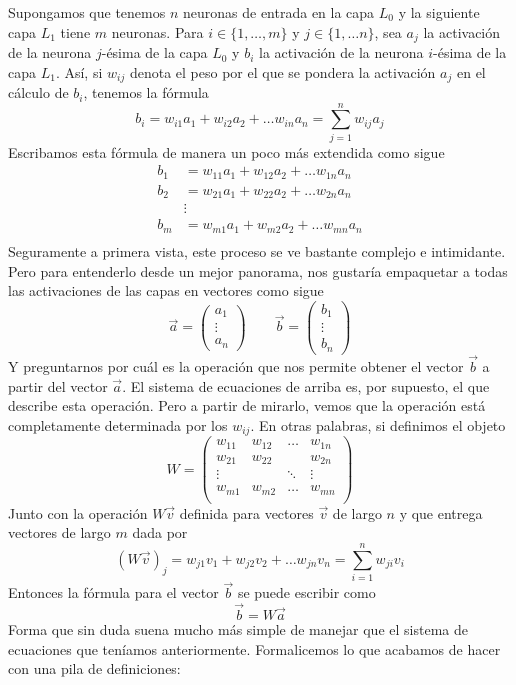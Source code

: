 Supongamos que tenemos $n$ neuronas de entrada en la capa $L_0$ y la siguiente capa $L_1$ tiene $m$ neuronas. Para $i \in \{1, \dots, m\}$ y $j \in \{1, \dots n\}$, sea $a_j$ la activación de la neurona $j$-ésima de la capa $L_0$ y $b_i$ la activación de la neurona $i$-ésima de la capa $L_1$. Así, si $w_{ij}$ denota el peso por el que se pondera la activación $a_j$ en el cálculo de $b_i$, tenemos la fórmula
\[b_i = w_{i1} a_1 + w_{i2} a_2 + \dots w_{in} a_n = \sum_{j=1}^n w_{ij} a_j\]
Escribamos esta fórmula de manera un poco más extendida como sigue
\begin{align*}
    b_1 &= w_{11} a_1 + w_{12} a_2 + \dots w_{1n} a_n \\
    b_2 &= w_{21} a_1 + w_{22} a_2 + \dots w_{2n} a_n \\
    &\vdots \\
    b_m &= w_{m1} a_1 + w_{m2} a_2 + \dots w_{mn} a_n \\
\end{align*}
Seguramente a primera vista, este proceso se ve bastante complejo e intimidante. Pero para entenderlo desde un mejor panorama, nos gustaría empaquetar a todas las activaciones de las capas en vectores como sigue
\[\vec{a} = \begin{pmatrix}
    a_1\\ \vdots \\ a_n
\end{pmatrix} \qquad \vec{b} = \begin{pmatrix}
    b_1\\ \vdots \\ b_n
\end{pmatrix}\]
Y preguntarnos por cuál es la operación que nos permite obtener el vector $\vec{b}$ a partir del vector $\vec{a}$. El sistema de ecuaciones de arriba es, por supuesto, el que describe esta operación. Pero a partir de mirarlo, vemos que la operación está completamente determinada por los $w_{ij}$. En otras palabras, si definimos el objeto
\[W = \begin{pmatrix}
    w_{11} & w_{12} & \dots & w_{1n} \\
    w_{21} & w_{22} &       & w_{2n} \\
    \vdots &        & \ddots& \vdots \\
    w_{m1} & w_{m2} & \dots & w_{mn} \\
\end{pmatrix}\]
Junto con la operación $W\vec{v}$ definida para vectores $\vec{v}$ de largo $n$ y que entrega vectores de largo $m$ dada por
\[(W\vec{v})_j = w_{j1} v_1 + w_{j2} v_2 + \dots w_{jn} v_n = \sum_{i = 1}^n w_{ji} v_i\]
Entonces la fórmula para el vector $\vec{b}$ se puede escribir como
\[\vec{b} = W \vec{a}\]
Forma que sin duda suena mucho más simple de manejar que el sistema de ecuaciones que teníamos anteriormente. Formalicemos lo que acabamos de hacer con una pila de definiciones:


